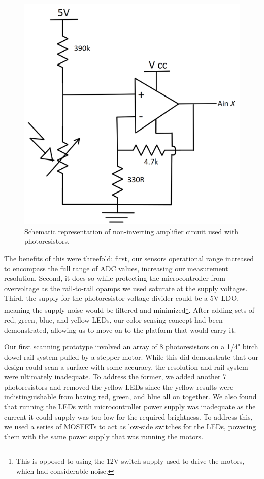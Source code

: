 \documentclass[12pt]{article}
\begin{document}
\begin{multicols*}{2}
            \begin{figure}[H]
                \centering\includegraphics[width=0.7\linewidth]{OpAmpSch.PNG}
                \captionsetup{width=\linewidth}
                \caption{Schematic representation of non-inverting amplifier circuit used with photoresistors.}
                \label{fig:opamp}
            \end{figure}

            The benefits of this were threefold: first, our sensors operational range increased to encompass the full range of ADC values, increasing our measurement resolution. Second, it does so while protecting the microcontroller from overvoltage as the rail-to-rail opamps we used saturate at the supply voltages. Third, the supply for the photoresistor voltage divider could be a 5V LDO, meaning the supply noise would be filtered and minimized\footnote{This is opposed to using the 12V switch supply used to drive the motors, which had considerable noise.}. After adding sets of red, green, blue, and yellow LEDs, our color sensing concept had been demonstrated, allowing us to move on to the platform that would carry it. 

            Our first scanning prototype involved an array of 8 photoresistors on a 1/4" birch dowel rail system pulled by a stepper motor. While this did demonstrate that our design could scan a surface with some accuracy, the resolution and rail system were ultimately inadequate. To address the former, we added another 7 photoresistors and removed the yellow LEDs since the yellow results were indistinguishable from having red, green, and blue all on together. We also found that running the LEDs with microcontroller power supply was inadequate as the current it could supply was too low for the required brightness. To address this, we used a series of MOSFETs to act as low-side switches for the LEDs, powering them with the same power supply that was running the motors.
            

\end{multicols*}
\end{document}

